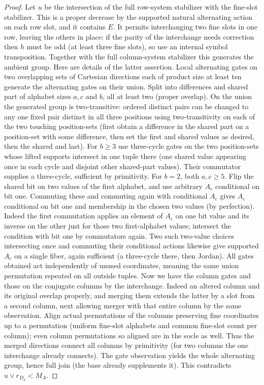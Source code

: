\begin{proof}
Let \(u\) be the intersection of the full row-system stabilizer with the fine-slot stabilizer. This is a
proper decrease by the supported natural alternating action on each row slot, and it contains \(E\). It
permits interchanging two fine slots in one row, leaving the others in place: if the parity of the
interchange needs correction then \(h\) must be odd (at least three fine slots), so use an internal
symbol transposition. Together with the full column-system stabilizer this generates the ambient group.
Here are details of the latter assertion. Local alternating gates on two overlapping sets of Cartesian
directions each of product size at least ten generate the alternating gates on their union. Split into
differences and shared part of alphabet sizes \(a,c\) and \(b\), all at least two (proper overlap). On
the union the generated group is two-transitive: ordered distinct pairs can be changed to any one fixed
pair distinct in all three positions using two-transitivity on each of the two touching position-sets
(first obtain a difference in the shared part on a position-set with some difference, then set the first
and shared values as desired, then the shared and last). For \(b\ge3\) use three-cycle gates on the two
position-sets whose lifted supports intersect in one tuple there (one shared value appearing once in each
cycle and disjoint other shared-part values). Their commutator supplies a three-cycle, sufficient by
primitivity. For \(b=2\), both \(a,c\ge5\). Flip the shared bit on two values of the first alphabet, and
use arbitrary \(A_c\) conditional on bit one. Commuting these and commuting again with conditional
\(A_c\) gives \(A_c\) conditional on bit one and membership in the chosen two values (by perfection).
Indeed the first commutation applies an element of \(A_c\) on one bit value and its inverse on the other
just for those two first-alphabet values; intersect the condition with bit one by commutators again. Two
such two-value choices intersecting once and commuting their conditional actions likewise give supported
\(A_c\) on a single fiber, again sufficient (a three-cycle there, then Jordan). All gates obtained act
independently of unused coordinates, meaning the same union permutation repeated on all outside tuples.
Now we have the column gates and those on the conjugate columns by the interchange. Indeed an altered
column and its original overlap properly, and merging them extends the latter by a slot from a second
column, next allowing merger with that entire column by the same observation. Align actual permutations
of the columns preserving fine coordinates up to a permutation (uniform fine-slot alphabets and common
fine-slot count per column); even column permutations so aligned are in the socle as well. Thus the
merged directions connect all columns by primitivity (for two columns the one interchange already
connects). The gate observation yields the whole alternating group, hence full join (the base already
supplements it). This contradicts \(u\vee r_{D_2}<M_A\).

\end{proof}


